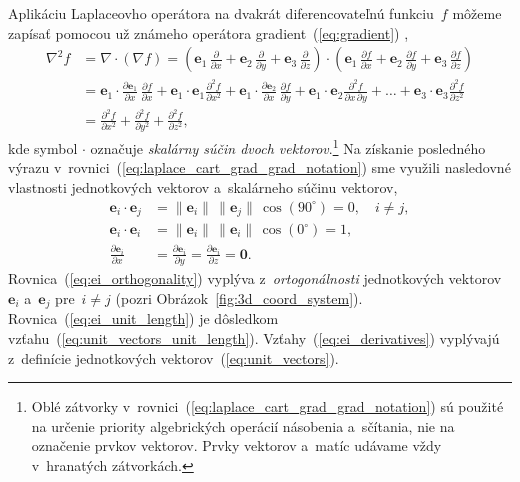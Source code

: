 \documentclass[a4paper, 12pt]{book}
\let\vec\mathbf
\begin{document}
Aplikáciu Laplaceovho operátora na dvakrát diferencovateľnú funkciu~$f$ môžeme 
zapísať pomocou už známeho operátora gradient~(\ref{eq:gradient}) 
\parencite{SansoGeoidDetermination},
%
\begin{equation}
\label{eq:laplace_cart_grad_grad_notation}
\begin{split}
\nabla^2 f &= \nabla \cdot \left( \nabla f \right) = \left( \vec e_1 \, 
\frac{\partial}{\partial x} + \vec e_2 \, \frac{\partial}{\partial y} + \vec 
e_3 \, \frac{\partial}{\partial z} \right) \cdot \left( \vec e_1 \, 
\frac{\partial f}{\partial x} + \vec e_2 \, \frac{\partial f}{\partial y} 
+ \vec e_3 \, \frac{\partial f}{\partial z} \right)\\
%
&= \vec e_1 \cdot \frac{\partial \vec e_1}{\partial x} \, \frac{\partial 
f}{\partial x} + \vec e_1 \cdot \vec e_1 \frac{\partial^2 f}{\partial x^2} 
+ \vec e_1 \cdot \frac{\partial \vec e_2}{\partial x} \, \frac{\partial 
f}{\partial y} + \vec e_1 \cdot \vec e_2 \frac{\partial^2 f}{\partial x \, 
\partial y} + \dots + \vec e_3 \cdot \vec e_3 \frac{\partial^2 f}{\partial 
z^2}\\
%
&=\frac{\partial^2 f}{\partial x^2} + \frac{\partial^2 f}{\partial y^2} 
+ \frac{\partial^2 f}{\partial z^2}{,}
\end{split}
\end{equation}
%
kde symbol $\cdot$ označuje \emph{skalárny súčin dvoch vektorov}.\footnote{Oblé 
zátvorky v~rovnici~(\ref{eq:laplace_cart_grad_grad_notation}) sú použité na 
určenie priority algebrických operácií násobenia a~sčítania, nie na označenie 
prvkov vektorov.  Prvky vektorov a~matíc udávame vždy v~hranatých zátvorkách.} 
Na získanie posledného výrazu 
v~rovnici~(\ref{eq:laplace_cart_grad_grad_notation}) sme využili nasledovné 
vlastnosti jednotkových vektorov a~skalárneho súčinu vektorov,
%
\begin{align}
\label{eq:ei_orthogonality}
\vec e_i \cdot \vec e_j &= \| \vec e_i \| \, \| \vec e_j \| \, \cos(90^\circ) 
= 0{,} \quad i \neq j{,}\\
%
\label{eq:ei_unit_length}
\vec e_i \cdot \vec e_i &= \| \vec e_i \| \, \| \vec e_i \| \, \cos(0^\circ) 
= 1{,}\\
%
\label{eq:ei_derivatives}
\frac{\partial \vec e_i}{\partial x} &= \frac{\partial \vec e_i}{\partial y} 
= \frac{\partial \vec e_i}{\partial z} = \vec 0{.}
\end{align}
%
Rovnica~(\ref{eq:ei_orthogonality}) vyplýva z~\emph{ortogonálnosti} 
jednotkových vektorov~$\vec e_i$ a~$\vec e_j$ pre~$i \neq j$ (pozri 
Obrázok~\ref{fig:3d_coord_system}).  Rovnica~(\ref{eq:ei_unit_length}) je 
dôsledkom vzťahu~(\ref{eq:unit_vectors_unit_length}).  
Vzťahy~(\ref{eq:ei_derivatives}) vyplývajú z~definície jednotkových 
vektorov~(\ref{eq:unit_vectors}).
\end{document}

